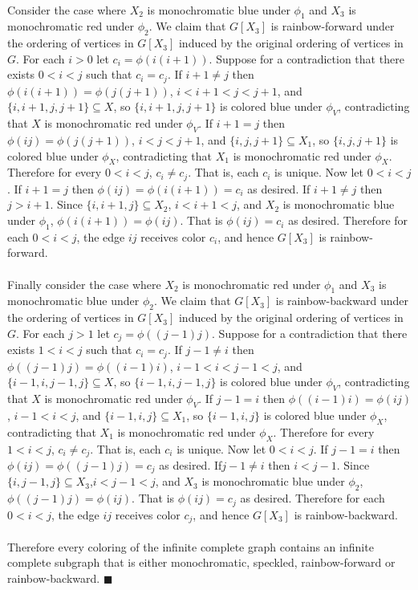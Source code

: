 \documentclass[letterpaper,12pt,oneside,onecolumn]{article}
\begin{document}
\paragraph{}
Consider the case where $X_2$ is monochromatic blue under $\phi_1$ and $X_3$ is monochromatic red under $\phi_2$. We claim that $G[X_3]$ is rainbow-forward under the ordering of vertices in $G[X_3]$ induced by the original ordering of vertices in $G$.  For each $i>0$ let $c_i = \phi(i(i+1))$. Suppose for a contradiction that there exists $0<i<j$ such that $c_i = c_j$. If $i+1 \neq j$ then $\phi(i(i+1)) = \phi(j(j+1))$, $i<i+1<j<j+1$, and $\{i,i+1,j,j+1\} \subseteq X$, so $\{i,i+1,j,j+1\}$ is colored blue under $\phi_V$, contradicting that $X$ is monochromatic red under $\phi_V$. If $i+1 = j$ then $\phi(ij) = \phi(j(j+1))$, $i<j<j+1$, and $\{i, j, j+1 \} \subseteq X_1$, so $\{i,j,j+1\}$ is colored blue under $\phi_X$, contradicting that $X_1$ is monochromatic red under $\phi_X$. Therefore for every $0<i<j$, $c_i \neq c_j$. That is, each $c_i$ is unique. Now let $0<i<j$. If $i+1=j$ then $\phi(ij) = \phi(i(i+1)) = c_i$ as desired. If $i+1 \neq j$ then $j > i+1$. Since $\{i,i+1,j\} \subseteq X_2$, $i<i+1<j$, and $X_2$ is monochromatic blue under $\phi_1$, $\phi(i(i+1)) = \phi(ij)$. That is $\phi(ij) = c_i$ as desired. Therefore for each $0<i<j$, the edge $ij$ receives color $c_i$, and hence $G[X_3]$ is rainbow-forward.
\paragraph{}
Finally consider the case where $X_2$ is monochromatic red under $\phi_1$ and $X_3$ is monochromatic blue under $\phi_2$. We claim that $G[X_3]$ is rainbow-backward under the ordering of vertices in $G[X_3]$ induced by the original ordering of vertices in $G$. For each $j>1$ let $c_j = \phi((j-1)j)$. Suppose for a contradiction that there exists $1<i<j$ such that $c_i = c_j$. If $j-1 \neq i$ then $\phi((j-1)j) = \phi((i-1)i)$, $i-1<i<j-1<j$, and $\{i-1,i,j-1,j\} \subseteq X$, so $\{i-1,i,j-1,j\}$ is colored blue under $\phi_V$, contradicting that $X$ is monochromatic red under $\phi_V$. If $j-1 = i$ then $\phi((i-1)i) = \phi(ij)$, $i-1<i<j$, and $\{i-1,i,j\} \subseteq X_1$, so $\{i-1,i,j\}$ is colored blue under $\phi_X$, contradicting that $X_1$ is monochromatic red under $\phi_X$. Therefore for every $1<i<j$, $c_i \neq c_j$. That is, each $c_i$ is unique. Now let $0<i<j$. If $j-1=i$ then $\phi(ij) = \phi((j-1)j) = c_j$ as desired. If$j-1 \neq i$ then $i<j-1$. Since $\{i,j-1,j\} \subseteq X_3$,$i<j-1<j$, and $X_3$ is monochromatic blue under $\phi_2$, $\phi((j-1)j) = \phi(ij)$. That is $\phi(ij) = c_j$ as desired. Therefore for each $0<i<j$, the edge $ij$ receives color $c_j$, and hence $G[X_3]$ is rainbow-backward.
\paragraph{}
Therefore every coloring of the infinite complete graph contains an infinite complete subgraph that is either monochromatic, speckled, rainbow-forward or rainbow-backward. $\blacksquare$
\end{document}
